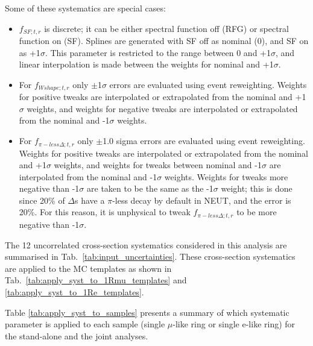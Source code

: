 \begin{enumerate}
Some of these systematics are special cases:
{
\begin{itemize}
\item 
  $f_{SF; t, r}$ is discrete; it can be either spectral function off (RFG) or spectral function on (SF). 
  Splines are generated with SF off as nominal (0), and SF on as +1$\sigma$.
  This parameter is restricted to the range between 0 and +1$\sigma$, and linear interpolation is made between the weights 
  for nominal and +1$\sigma$.
\item 
  For $f_{Wshape; t, r}$ only $\pm$1$\sigma$ errors are evaluated using event reweighting. 
  Weights for positive tweaks are interpolated or extrapolated from the nominal and +1$\sigma$ weights, and weights for negative tweaks are interpolated or extrapolated from the nominal and -1$\sigma$ weights.
\item 
  For $f_{\pi-less\Delta; t, r}$ only $\pm$1.0 sigma errors are evaluated using event reweighting.
  Weights for positive tweaks are interpolated or extrapolated from the nominal and +1$\sigma$ weights, and weights for tweaks between nominal and -1$\sigma$ are interpolated from the nominal and -1$\sigma$ weights. Weights for tweaks more negative than -1$\sigma$ are taken to be the same as the -1$\sigma$ weight; this is done since 20\% of $\Delta$s have a $\pi$-less decay by default in NEUT, and the error is 20\%. For this reason, it is unphysical to tweak $f_{\pi-less\Delta; t, r}$ to be more negative than -1$\sigma$. 
\end{itemize}
}

The 12 uncorrelated cross-section systematics considered in this analysis are summarised in Tab.\ \ref{tab:input_uncertainties}.
These cross-section systematics are applied to the MC templates as shown in Tab.\ \ref{tab:apply_syst_to_1Rmu_templates} and \ref{tab:apply_syst_to_1Re_templates}.\\

\end{enumerate}

Table \ref{tab:apply_syst_to_samples} presents a summary of which systematic parameter is applied to each sample (single $\mu$-like ring or single e-like ring) for the stand-alone and the joint analyses. 






